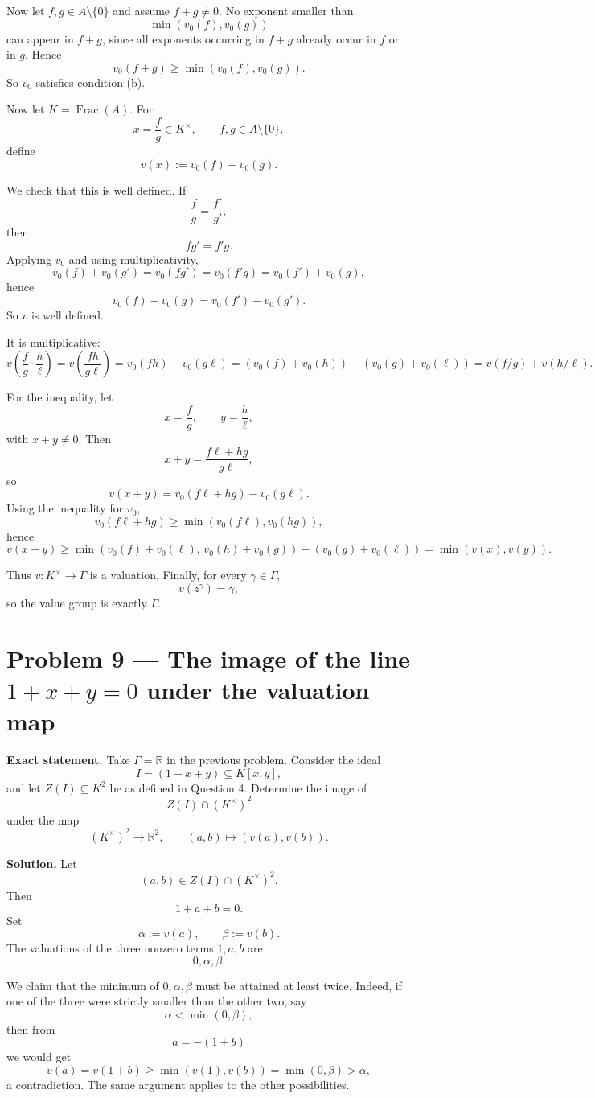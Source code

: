 \documentclass[12pt,a4paper]{article}
\theoremstyle{notespace}
\begin{document}
Now let \(f,g\in A\setminus\{0\}\) and assume \(f+g\neq 0\). No exponent smaller than
\[
\min(v_0(f),v_0(g))
\]
can appear in \(f+g\), since all exponents occurring in \(f+g\) already occur in \(f\) or in \(g\). Hence
\[
v_0(f+g)\ge \min(v_0(f),v_0(g)).
\]
So \(v_0\) satisfies condition (b).

Now let \(K=\operatorname{Frac}(A)\). For
\[
x=\frac{f}{g}\in K^\times,\qquad f,g\in A\setminus\{0\},
\]
define
\[
v(x):=v_0(f)-v_0(g).
\]

We check that this is well defined. If
\[
\frac{f}{g}=\frac{f'}{g'},
\]
then
\[
fg'=f'g.
\]
Applying \(v_0\) and using multiplicativity,
\[
v_0(f)+v_0(g')=v_0(fg')=v_0(f'g)=v_0(f')+v_0(g),
\]
hence
\[
v_0(f)-v_0(g)=v_0(f')-v_0(g').
\]
So \(v\) is well defined.

It is multiplicative:
\[
v\!\left(\frac{f}{g}\cdot\frac{h}{\ell}\right)
=v\!\left(\frac{fh}{g\ell}\right)
=v_0(fh)-v_0(g\ell)
=(v_0(f)+v_0(h))-(v_0(g)+v_0(\ell))
=v(f/g)+v(h/\ell).
\]

For the inequality, let
\[
x=\frac{f}{g},\qquad y=\frac{h}{\ell},
\]
with \(x+y\neq 0\). Then
\[
x+y=\frac{f\ell+hg}{g\ell},
\]
so
\[
v(x+y)=v_0(f\ell+hg)-v_0(g\ell).
\]
Using the inequality for \(v_0\),
\[
v_0(f\ell+hg)\ge \min(v_0(f\ell),v_0(hg)),
\]
hence
\[
v(x+y)\ge \min(v_0(f)+v_0(\ell),\,v_0(h)+v_0(g))-(v_0(g)+v_0(\ell))
=\min(v(x),v(y)).
\]

Thus \(v:K^\times\to \Gamma\) is a valuation. Finally, for every \(\gamma\in\Gamma\),
\[
v(z^\gamma)=\gamma,
\]
so the value group is exactly \(\Gamma\).

\bigskip

\section{Problem 9 --- The image of the line \texorpdfstring{$1+x+y=0$}{1+x+y=0} under the valuation map}

\textbf{Exact statement.}
Take \(\Gamma=\mathbb R\) in the previous problem. Consider the ideal
\[
I=(1+x+y)\subseteq K[x,y],
\]
and let \(Z(I)\subseteq K^2\) be as defined in Question 4. Determine the image of
\[
Z(I)\cap (K^\times)^2
\]
under the map
\[
(K^\times)^2\to \mathbb R^2,\qquad (a,b)\mapsto (v(a),v(b)).
\]

\textbf{Solution.}
Let
\[
(a,b)\in Z(I)\cap (K^\times)^2.
\]
Then
\[
1+a+b=0.
\]
Set
\[
\alpha:=v(a),\qquad \beta:=v(b).
\]
The valuations of the three nonzero terms \(1,a,b\) are
\[
0,\alpha,\beta.
\]

We claim that the minimum of \(0,\alpha,\beta\) must be attained at least twice. Indeed, if one of the three were strictly smaller than the other two, say
\[
\alpha<\min(0,\beta),
\]
then from
\[
a=-(1+b)
\]
we would get
\[
v(a)=v(1+b)\ge \min(v(1),v(b))=\min(0,\beta)>\alpha,
\]
a contradiction. The same argument applies to the other possibilities.
\end{document}
